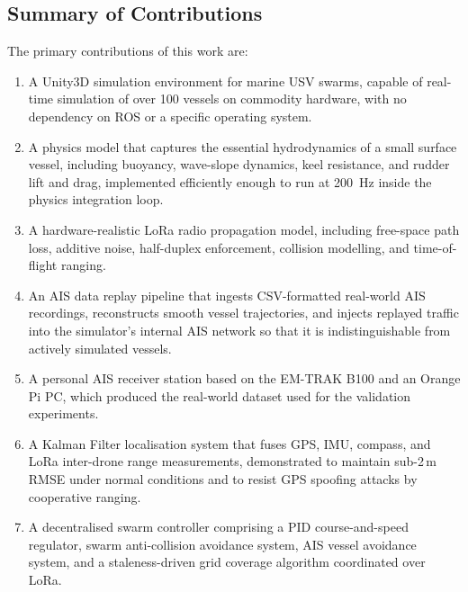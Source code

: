 \subsection*{Summary of Contributions}

The primary contributions of this work are:

\begin{enumerate}
    \item A Unity3D simulation environment for marine USV
    swarms, capable of real-time simulation of over 100 vessels on commodity
    hardware, with no dependency on ROS or a specific operating system.

    \item A physics model that captures the essential hydrodynamics of a
    small surface vessel, including buoyancy, wave-slope dynamics, keel
    resistance, and rudder lift and drag, implemented efficiently enough to
    run at 200~Hz inside the physics integration loop.

    \item A hardware-realistic LoRa radio propagation model, including
    free-space path loss, additive noise, half-duplex enforcement, collision
    modelling, and time-of-flight ranging.

    \item An AIS data replay pipeline that ingests CSV-formatted real-world
    AIS recordings, reconstructs smooth vessel trajectories, and injects replayed traffic into the simulator's internal AIS network so that it is indistinguishable from actively simulated vessels.

    \item A personal AIS receiver station based on the EM-TRAK B100 and an
    Orange Pi PC, which produced the real-world dataset used for the
    validation experiments.

    \item A Kalman Filter localisation system that fuses GPS, IMU, compass,
    and LoRa inter-drone range measurements, demonstrated to maintain
    sub-2\,m RMSE under normal conditions and to resist GPS spoofing
    attacks by cooperative ranging.

    \item A decentralised swarm controller comprising a PID course-and-speed
    regulator, swarm anti-collision avoidance system, AIS vessel avoidance system,
    and a staleness-driven grid coverage algorithm coordinated over LoRa.
\end{enumerate}

